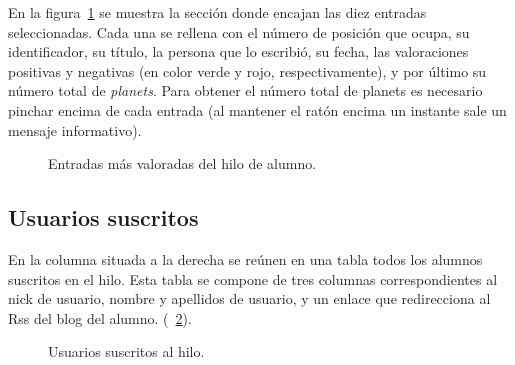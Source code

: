 \documentclass[a4paper, 12pt]{book}
\begin{document}
En la figura~\ref{figura:hiloalumno3} se muestra la secci\'on donde encajan las diez entradas seleccionadas. Cada una se rellena con el n\'umero de 
posici\'on que ocupa, su identificador, su t\'itulo, la persona que lo escribi\'o, su fecha, las valoraciones positivas y negativas (en color verde y rojo,
respectivamente), y por \'ultimo su n\'umero total de \textit{planets}. Para obtener el n\'umero total de planets es necesario pinchar encima de cada 
entrada (al mantener el rat\'on encima un instante sale un mensaje informativo).
\begin{figure}[htbp] 
  \centering
  \caption{Entradas m\'as valoradas del hilo de alumno.}
  \label{figura:hiloalumno3}
\end{figure}

\subsection{Usuarios suscritos}
En la columna situada a la derecha se re\'unen en una tabla todos los alumnos suscritos en el hilo. Esta tabla se compone de tres columnas correspondientes
al nick de usuario, nombre y apellidos de usuario, y un enlace que redirecciona al Rss del blog del alumno. 
(~\ref{figura:hiloalumno4}).
\begin{figure}[htbp] 
  \centering
  \caption{Usuarios suscritos al hilo.}
  \label{figura:hiloalumno4}
\end{figure}
\end{document}
